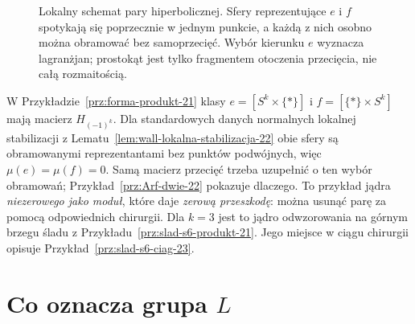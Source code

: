 \begin{figure}[htbp]
\centering
{}
\caption{Lokalny schemat pary hiperbolicznej.
Sfery reprezentujące $e$ i $f$ spotykają się poprzecznie
w jednym punkcie, a każdą z nich osobno można
obramować bez samoprzecięć. Wybór kierunku $e$
wyznacza lagranżjan; prostokąt jest tylko fragmentem
otoczenia przecięcia, nie całą rozmaitością.}
\label{fig:hiperboliczna-22}
\end{figure}

\begin{przyklad}
\label{prz:produkt-L-22}
W Przykładzie~\ref{prz:forma-produkt-21}
klasy $e=[S^k\times\{*\}]$ i
$f=[\{*\}\times S^k]$ mają macierz $H_{(-1)^k}$.
Dla standardowych danych normalnych lokalnej
stabilizacji z
Lematu~\ref{lem:wall-lokalna-stabilizacja-22}
obie sfery są obramowanymi reprezentantami
bez punktów podwójnych, więc
$\mu(e)=\mu(f)=0$. Samą macierz przecięć
trzeba uzupełnić o ten wybór obramowań;
Przykład~\ref{prz:Arf-dwie-22} pokazuje dlaczego.
To przykład jądra \emph{niezerowego jako moduł},
które daje \emph{zerową przeszkodę}:
można usunąć parę za pomocą odpowiednich chirurgii.
Dla $k=3$ jest to jądro odwzorowania na górnym brzegu
śladu z Przykładu~\ref{prz:slad-s6-produkt-21}.
Jego miejsce w ciągu chirurgii opisuje
Przykład~\ref{prz:slad-s6-ciag-23}.
\end{przyklad}

\section{Co oznacza grupa \texorpdfstring{$L$}{L}}
\label{sec:grupy-L-22}

